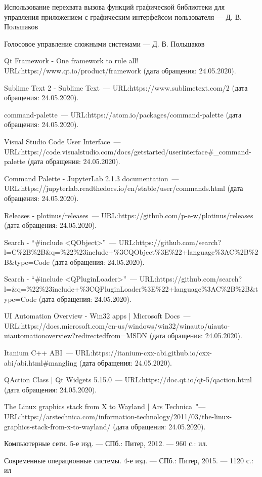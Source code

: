 \renewcommand{\bibname}{Список использованных источников}
\begin{thebibliography}{99}

 Использование перехвата вызова функций графической библиотеки для управления приложением с графическим интерфейсом пользователя --- Д. В. Польшаков

 Голосовое управление сложными системами --- Д. В. Польшаков

 Qt Framework - One framework to rule all!
URL:\@ https://www.qt.io/product/framework
(дата обращения: 24.05.2020).

 Sublime Text 2 \-- Sublime Text~---
URL:\@ https://www.sublimetext.com/2
(дата обращения: 24.05.2020).

 command-palette~---
URL:\@ https://atom.io/packages/command-palette
(дата обращения: 24.05.2020).

 Visual Studio Code User Interface~---
URL:\@ https://code.visualstudio.com/docs/getstarted/userinterface\#\_command-palette
(дата обращения: 24.05.2020).

 Command Palette \-- JupyterLab 2.1.3 documentation~---
URL:\@ https://jupyterlab.readthedocs.io/en/stable/user/commands.html
(дата обращения: 24.05.2020).

 Releases \-- plotinus/releases~---
URL:\@  https://github.com/p-e-w/plotinus/releases
(дата обращения: 24.05.2020).

 Search \-- ``\#include <QObject>''~---
URL:\@ https://github.com/search?l=C\%2B\%2B\&q=\%22\%23include+\%3CQObject\%3E\%22+language\%3AC\%2B\%2B\&type=Code
(дата обращения: 24.05.2020).

 Search \-- ``\#include <QPluginLoader>''~---
URL:\@ https://github.com/search?l=\&q=\%22\%23include+\%3CQPluginLoader\%3E\%22+language\%3AC\%2B\%2B\&type=Code
(дата обращения: 24.05.2020).

 UI Automation Overview \-- Win32 apps | Microsoft Docs~---
URL:\@ https://docs.microsoft.com/en-us/windows/win32/winauto/uiauto-uiautomationoverview?redirectedfrom=MSDN
(дата обращения: 24.05.2020).

 Itanium C++ ABI~---
URL:\@ https://itanium-cxx-abi.github.io/cxx-abi/abi.html\#mangling
(дата обращения: 24.05.2020).

 QAction Class | Qt Widgets 5.15.0~---
URL:\@ https://doc.qt.io/qt-5/qaction.html
(дата обращения: 24.05.2020).

 The Linux graphics stack from X to Wayland | Ars Technica~"---
URL:\@ https://arstechnica.com/information-technology/2011/03/the-linux-graphics-stack-from-x-to-wayland/
(дата обращения: 24.05.2020).

 Компьютерные сети. 5-е изд. — СПб.: Питер, 2012. — 960 с.: ил.

 Современные операционные системы. 4-е изд. — СПб.: Питер, 2015. — 1120 с.: ил

\end{thebibliography}

